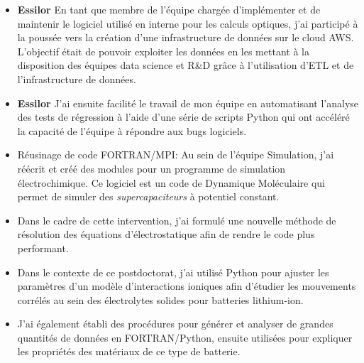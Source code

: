 \documentclass[10pt,a4paper,ragged2e,academicons]{altacv}
\begin{document}
\divider

\begin{itemize}
\justifying  
\item \textbf{Essilor} En tant que membre de l'équipe chargée d'implémenter et de maintenir le logiciel utilisé en interne pour les calculs optiques, j'ai participé à la poussée vers la création d'une infrastructure de données sur le cloud AWS. L'objectif était de pouvoir exploiter les données en les mettant à la disposition des équipes data science et R\&D grâce à l'utilisation d'ETL et de l'infrastructure de données.
\item \textbf{Essilor} J'ai ensuite facilité le travail de mon équipe en automatisant l'analyse des tests de régression à l'aide d'une série de scripts Python qui ont accéléré la capacité de l'équipe à répondre aux bugs logiciels.
\end{itemize}

\divider

\begin{itemize}
\justifying  
\item Réusinage de code FORTRAN/MPI:
Au sein de l'équipe Simulation, j'ai réécrit et créé des modules pour un programme de simulation électrochimique.  
Ce logiciel est un code de Dynamique Moléculaire qui permet de simuler des \textit{supercapaciteurs} à potentiel constant.
\item Dans le cadre de cette intervention, j'ai formulé une nouvelle méthode de résolution des équations d’électrostatique afin de rendre le code plus performant. 
\end{itemize}

\clearpage
{}

\begin{itemize}
\justifying  
\item Dans le contexte de ce postdoctorat, j'ai utilisé Python pour ajuster les paramètres d'un modèle d'interactions ioniques afin d'étudier les mouvements corrélés au sein des électrolytes solides pour batteries lithium-ion.
\item J'ai également établi des procédures pour générer et analyser de grandes quantités de données en FORTRAN/Python, ensuite utilisées pour expliquer les propriétés des matériaux de ce type de batterie.
\end{itemize}
\end{document}
